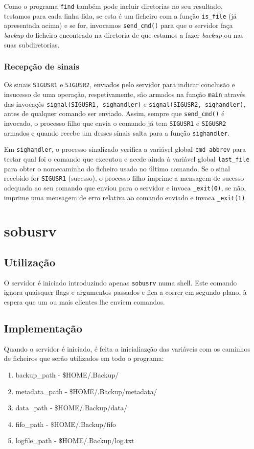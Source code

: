 \documentclass[a4paper,12pt,titlepage,draft,portuguese]{article}
\begin{document}
Como o programa \texttt{find} também pode incluir diretorias no seu resultado, testamos para cada linha lida, se esta é um ficheiro com a função \texttt{is\_file} (já apresentada acima) e se for, invocamos \texttt{send\_cmd()} para que o servidor faça \emph{backup} do ficheiro encontrado na diretoria de que estamos a fazer \emph{backup} ou nas suas subdiretorias. 

\subsubsection{Recepção de sinais}

Os sinais \texttt{SIGUSR1} e \texttt{SIGUSR2}, enviados pelo servidor para indicar conclusão e insucesso de uma operação, respetivamente, são armados na função \texttt{main} através das invocaçõs \texttt{signal(SIGUSR1, sighandler)} e
\texttt{signal(SIGUSR2, sighandler)}, antes de qualquer comando ser enviado. Assim, sempre que \texttt{send\_cmd()} é invocado, o processo filho que envia o comando já tem \texttt{SIGUSR1} e \texttt{SIGUSR2} armados e quando recebe um desses sinais salta para a função \texttt{sighandler}. 

Em \texttt{sighandler}, o processo sinalizado verifica a variável global \texttt{cmd\_abbrev} para testar qual foi o comando que executou e acede ainda à variável global \texttt{last\_file} para obter o nome\/caminho do ficheiro usado no último comando. Se o sinal recebido for \texttt{SIGUSR1} (sucesso), o processo filho imprime a mensagem de sucesso adequada ao seu comando que enviou para o servidor e invoca \texttt{\_exit(0)}, se não, imprime uma mensagem de erro relativa ao comando enviado e invoca \texttt{\_exit(1)}.

\section{sobusrv}
\subsection{Utilização}
O servidor é iniciado introduzindo apenas \texttt{sobusrv} numa shell. Este comando ignora quaisquer flags e argumentos passados e fica a correr em segundo plano, à 
espera que um ou mais clientes lhe enviem comandos.
\subsection{Implementação}
Quando o servidor é iniciado, é feita a inicialiazção das variáveis com os caminhos de ficheiros que serão utilizados em todo o programa:
\begin{enumerate}
\item backup\_path - \$HOME/.Backup/
\item metadata\_path -  \$HOME/.Backup/metadata/
\item data\_path - \$HOME/.Backup/data/   
\item fifo\_path - \$HOME/.Backup/fifo
\item logfile\_path - \$HOME/.Backup/log.txt
\end{enumerate}
	
\end{document}
